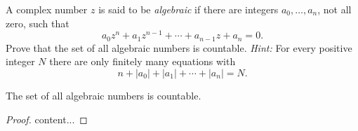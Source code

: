 \begin{exercise}
	A complex number $z$ is said to be \textit{algebraic} if there are integers $a_0,\ldots,a_n$, not all zero, such that
	\begin{equation*}
	a_0z^n + a_1z^{n-1} + \cdots + a_{n-1}z + a_n = 0.
	\end{equation*}
	Prove that the set of all algebraic numbers is countable. \textit{Hint:} For every positive integer $N$ there are only finitely many equations with
	\begin{equation*}
	n + |a_0| + |a_1| + \cdots + |a_n| = N.
	\end{equation*}
\end{exercise}
\begin{proposition}
	The set of all algebraic numbers is countable.
\end{proposition}
\begin{proof}
	content...
\end{proof}
